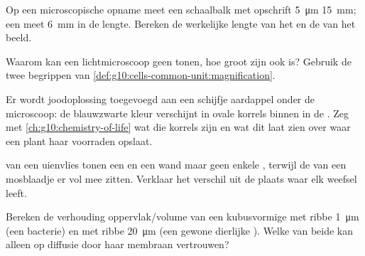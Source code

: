 \begin{exercise}[$\star\star$]\label{exo:g10:cells-common-unit:6}
Op een microscopische opname meet een schaalbalk met opschrift
\qty{5}{\micro m} \qty{15}{mm}; een  meet \qty{6}{mm} in de
lengte. Bereken de werkelijke lengte van het  en de
 van het beeld.
\end{exercise}

\begin{exercise}[$\star\star$]\label{exo:g10:cells-common-unit:7}
Waarom kan een lichtmicroscoop geen  tonen, hoe groot zijn
 ook is? Gebruik de twee begrippen van
\cref{def:g10:cells-common-unit:magnification}.
\end{exercise}

\begin{exercise}[$\star\star$]\label{exo:g10:cells-common-unit:8}
Er wordt joodoplossing toegevoegd aan een schijfje aardappel onder de
microscoop: de blauwzwarte kleur verschijnt in ovale korrels binnen in
de . Zeg met \cref{ch:g10:chemistry-of-life} wat die korrels zijn
en wat dit laat zien over waar een plant haar voorraden opslaat.
\end{exercise}

\begin{exercise}[$\star\star$]\label{exo:g10:cells-common-unit:9}
 van een uienvlies tonen een  en een wand maar geen enkele
, terwijl de  van een mosblaadje er vol mee zitten.
Verklaar het verschil uit de plaats waar elk weefsel leeft.
\end{exercise}

\begin{exercise}[$\star\star$]\label{exo:g10:cells-common-unit:10}
Bereken de verhouding oppervlak/volume van een kubusvormige  met
ribbe \qty{1}{\micro m} (een bacterie) en met ribbe \qty{20}{\micro m}
(een gewone dierlijke ). Welke van beide kan alleen op diffusie door
haar membraan vertrouwen?
\end{exercise}

